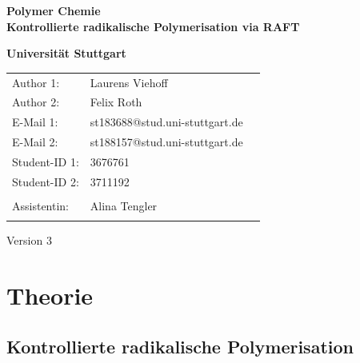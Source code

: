 \documentclass[10pt,a4paper,ngerman]{scrartcl}
\begin{document}
\begin{titlepage}
	\vspace*{2,5cm}
	\begin{center}
		\begin{LARGE}
			\textbf{Polymer Chemie}\\
			\textbf{Kontrollierte radikalische Polymerisation via RAFT}\\
		\end{LARGE}
		\vspace{1cm}
		\textbf{Universität Stuttgart}\\
		\vspace*{1,5cm}
		\begin{tabular}{lp{}l}
			Author 1:     &Laurens Viehoff\\
            Author 2:     &Felix Roth\\   
			E-Mail 1:      &st183688@stud.uni-stuttgart.de\\
            E-Mail 2:      &st188157@stud.uni-stuttgart.de  \\
			Student-ID 1: & 3676761   \\ 
            Student-ID 2: & 3711192 \\ \\
			Assistentin:  & Alina Tengler \\ \\ 
		\end{tabular}
		
			\vspace{2cm}
			Version 3\\
	\end{center}

    
\end{titlepage}
\thispagestyle{empty}
\renewcommand{\thepage}{\arabic{page}}
\newpage
\tableofcontents
\setcounter{page}{1}
\renewcommand{\thepage}{\arabic{page}}
\newpage

\section{Theorie}

	\subsection{Kontrollierte radikalische Polymerisation}
\end{document}
